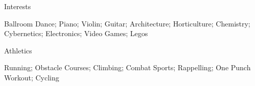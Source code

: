 \documentclass{resume} %
\begin{document}
\fi
\begin{rSection}{Interests} \itemsep -3pt
\item Ballroom Dance; Piano; Violin; Guitar; Architecture; Horticulture; Chemistry; Cybernetics; Electronics; Video Games; Legos

\end{rSection}
\begin{rSection}{Athletics} \itemsep -3pt
\item Running; Obstacle Courses; Climbing; Combat Sports; Rappelling; One Punch Workout; Cycling

\end{rSection}
\end{document}
